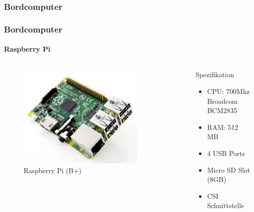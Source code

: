 \subsubsection{Bordcomputer}
\begin{frame}
	\frametitle{Bordcomputer\hfill{}\footnotesize \group}
	\framesubtitle{Raspberry Pi}
	
	\begin{columns}
		\begin{column}{0.5\textwidth}
			\begin{figure}
				\centering
				\includegraphics[width=0.8\textwidth]{../../fig/raspberry-pi-b-plus.jpg}
				\caption{Raspberry Pi (B+)}
			\end{figure}
		\end{column}
		\begin{column}{0.5\textwidth}
			\begin{block}{Spezifikation}
				\begin{itemize}
					\item CPU: 700Mhz Broadcom BCM2835
					\item RAM: 512 MB
					\item 4 USB Ports
					\item Micro SD Slot (8GB)
					\item CSI Schnittstelle
				\end{itemize}
			\end{block}
		\end{column}
	\end{columns}
	
    
    
	
\end{frame}

